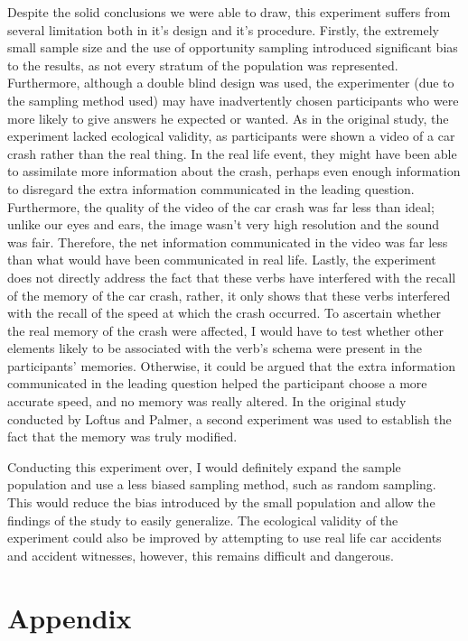 \documentclass[a4paper,11pt]{report}
\begin{document}
Despite the solid conclusions we were able to draw, this experiment suffers
from several limitation both in it’s design and it’s procedure. Firstly,
the extremely small sample size and the use of opportunity sampling
introduced significant bias to the results, as not every stratum of the
population was represented. Furthermore, although a double blind design was
used, the experimenter (due to the sampling method used) may have
inadvertently chosen participants who were more likely to give answers he
expected or wanted. As in the original study, the experiment lacked
ecological validity, as participants were shown a video of a car crash
rather than the real thing. In the real life event, they might have been
able to assimilate more information about the crash, perhaps even enough
information to disregard the extra information communicated in the leading
question. Furthermore, the quality of the video of the car crash was far
less than ideal; unlike our eyes and ears, the image wasn’t very high
resolution and the sound was fair. Therefore, the net information
communicated in the video was far less than what would have been
communicated in real life. Lastly, the experiment does not directly
address the fact that these verbs have interfered with the recall of the
memory of the car crash, rather, it only shows that these verbs interfered
with the recall of the speed at which the crash occurred. To ascertain
whether the real memory of the crash were affected, I would have to test
whether other elements likely to be associated with the verb’s schema were
present in the participants’ memories. Otherwise, it could be argued that
the extra information communicated in the leading question helped the
participant choose a more accurate speed, and no memory was really altered.
In the original study conducted by Loftus and Palmer, a second experiment
was used to establish the fact that the memory was truly modified.

Conducting this experiment over, I would definitely expand the sample
population and use a less biased sampling method, such as random sampling.
This would reduce the bias introduced by the small population and allow the
findings of the study to easily generalize. The ecological validity of the
experiment could also be improved by attempting to use real life car
accidents and accident witnesses, however, this remains difficult and
dangerous.




\clearpage
\section{Appendix}
\end{document}
